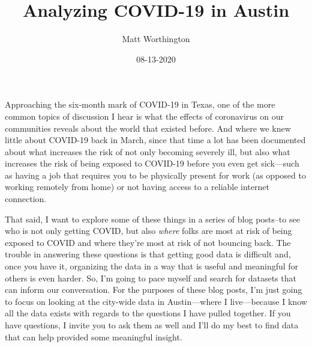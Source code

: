\documentclass[
]{report}
\title{Analyzing COVID-19 in Austin}
\author{Matt Worthington}
\date{08-13-2020}
\renewcommand*\contentsname{Table of contents}
\begin{document}
\maketitle

\ifdefined\Shaded\renewenvironment{Shaded}{\begin{tcolorbox}[frame hidden, interior hidden, borderline west={3pt}{0pt}{shadecolor}, enhanced, boxrule=0pt, sharp corners]}{\end{tcolorbox}}\fi

\renewcommand*\contentsname{Contents}
{
\hypersetup{linkcolor=}
\setcounter{tocdepth}{2}
\tableofcontents
}
\listoffigures
\listoftables
Approaching the six-month mark of COVID-19 in Texas, one of the more
common topics of discussion I hear is what the effects of coronavirus on
our communities reveals about the world that existed before. And where
we knew little about COVID-19 back in March, since that time a lot has
been documented about what increases the risk of not only becoming
severely ill, but also what increases the risk of being exposed to
COVID-19 before you even get sick---such as having a job that requires
you to be physically present for work (as opposed to working remotely
from home) or not having access to a reliable internet connection.

That said, I want to explore some of these things in a series of blog
posts--to see who is not only getting COVID, but also \emph{where} folks
are most at risk of being exposed to COVID and where they're most at
risk of not bouncing back. The trouble in answering these questions is
that getting good data is difficult and, once you have it, organizing
the data in a way that is useful and meaningful for others is even
harder. So, I'm going to pace myself and search for datasets that can
inform our conversation. For the purposes of these blog posts, I'm just
going to focus on looking at the city-wide data in Austin---where I
live---because I know all the data exists with regards to the questions
I have pulled together. If you have questions, I invite you to ask them
as well and I'll do my best to find data that can help provided some
meaningful insight.

\end{document}
